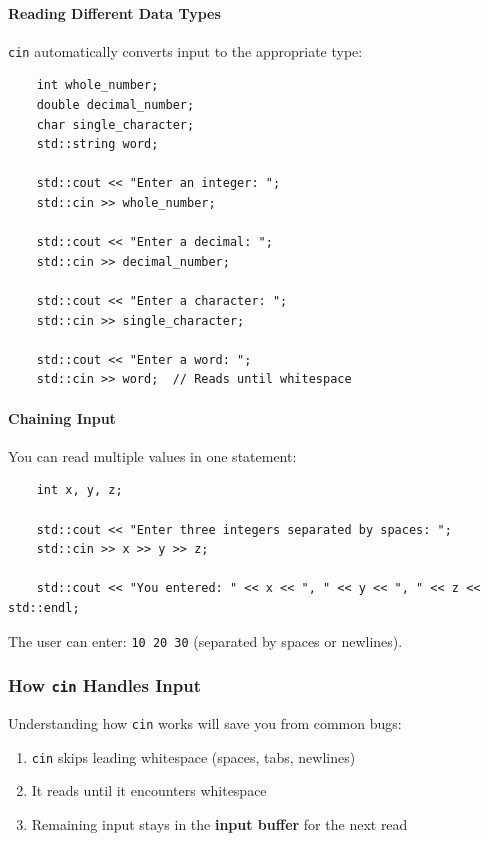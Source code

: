 \paragraph{Reading Different Data Types}

\texttt{cin} automatically converts input to the appropriate type:

\begin{lstlisting}
	int whole_number;
	double decimal_number;
	char single_character;
	std::string word;
	
	std::cout << "Enter an integer: ";
	std::cin >> whole_number;
	
	std::cout << "Enter a decimal: ";
	std::cin >> decimal_number;
	
	std::cout << "Enter a character: ";
	std::cin >> single_character;
	
	std::cout << "Enter a word: ";
	std::cin >> word;  // Reads until whitespace
\end{lstlisting}

\paragraph{Chaining Input}

You can read multiple values in one statement:

\begin{lstlisting}
	int x, y, z;
	
	std::cout << "Enter three integers separated by spaces: ";
	std::cin >> x >> y >> z;
	
	std::cout << "You entered: " << x << ", " << y << ", " << z << std::endl;
\end{lstlisting}

The user can enter: \texttt{10 20 30} (separated by spaces or newlines).

\subsubsection{How \texttt{cin} Handles Input}

Understanding how \texttt{cin} works will save you from common bugs:

\begin{enumerate}
	\item \texttt{cin} skips leading whitespace (spaces, tabs, newlines)
	\item It reads until it encounters whitespace
	\item Remaining input stays in the \textbf{input buffer} for the next read
\end{enumerate}

